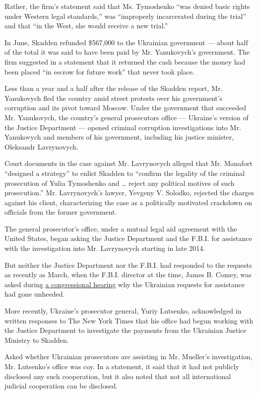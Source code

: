 Rather, the firm's statement said that Ms. Tymoshenko ``was denied basic
rights under Western legal standards,'' was ``improperly incarcerated
during the trial'' and that ``in the West, she would receive a new
trial.''

In June, Skadden refunded \$567,000 to the Ukrainian government ---
about half of the total it was said to have been paid by Mr.
Yanukovych's government. The firm suggested in a statement that it
returned the cash because the money had been placed ``in escrow for
future work'' that never took place.

Less than a year and a half after the release of the Skadden report, Mr.
Yanukovych fled the country amid street protests over his government's
corruption and its pivot toward Moscow. Under the government that
succeeded Mr. Yanukovych, the country's general prosecutors office ---
Ukraine's version of the Justice Department --- opened criminal
corruption investigations into Mr. Yanukovych and members of his
government, including his justice minister, Oleksandr Lavrynovych.

Court documents in the case against Mr. Lavrynovych alleged that Mr.
Manafort ``designed a strategy'' to enlist Skadden to ``confirm the
legality of the criminal prosecution of Yulia Tymoshenko and \ldots{}
reject any political motives of such prosecution.'' Mr. Lavrynovych's
lawyer, Yevgeny V. Solodko, rejected the charges against his client,
characterizing the case as a politically motivated crackdown on
officials from the former government.

The general prosecutor's office, under a mutual legal aid agreement with
the United States, began asking the Justice Department and the F.B.I.
for assistance with the investigation into Mr. Lavrynovych starting in
late 2014.

But neither the Justice Department nor the F.B.I. had responded to the
requests as recently as March, when the F.B.I. director at the time,
James B. Comey, was asked during
\href{https://www.nytimes.com/2017/03/20/us/politics/intelligence-committee-russia-donald-trump.html?mcubz=3}{a
congressional hearing} why the Ukrainian requests for assistance had
gone unheeded.

More recently, Ukraine's prosecutor general, Yuriy Lutsenko,
acknowledged in written responses to The New York Times that his office
had begun working with the Justice Department to investigate the
payments from the Ukrainian Justice Ministry to Skadden.

Asked whether Ukrainian prosecutors are assisting in Mr. Mueller's
investigation, Mr. Lutsenko's office was coy. In a statement, it said
that it had not publicly disclosed any such cooperation, but it also
noted that not all international judicial cooperation can be disclosed.

